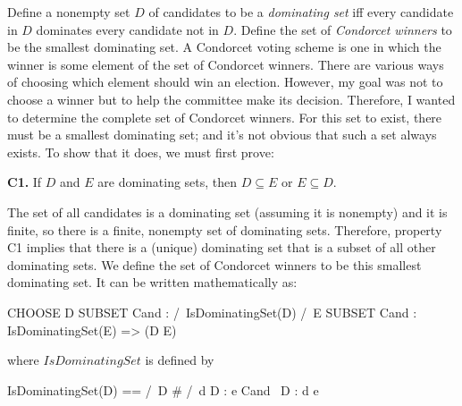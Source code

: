 \documentclass[fleqn,leqno]{article}
\begin{document}
Define a nonempty set $D$ of candidates to be a 
\emph{dominating set}
iff every candidate in $D$ dominates every candidate not in $D$.
Define the set of \emph{Condorcet winners} to be the smallest
dominating set.  A Condorcet voting scheme is one in
which the winner is some element of the set of Condorcet winners.
There are various ways of choosing which element should win an
election.  However, my goal was not to choose a winner but to help the
committee make its decision.  Therefore, I wanted to determine the
complete set of Condorcet winners.  For this set to exist, there must
be a smallest dominating set; and it's not obvious that such a set
always exists.  To show that it does, we must first prove:
\begin{display}
\textbf{C1.} If $D$ and $E$ are dominating sets, then $D\subseteq E$
or $E \subseteq D$.
%
\end{display}
The set of all candidates is a dominating set (assuming it is
nonempty) and it is finite, so there is a finite, nonempty set of
dominating sets.  Therefore, property C1 implies that there is
a (unique) dominating set that is a subset of all other dominating
sets.  We define the set of Condorcet winners to be this smallest
dominating set.  It can be written mathematically as:
\begin{display}
\begin{notla}
CHOOSE D \in SUBSET Cand : 
  /\ IsDominatingSet(D)
  /\ \A E \in SUBSET Cand : IsDominatingSet(E) => (D \subseteq E)
\end{notla}
\begin{tlatex}
%
%
\end{tlatex}
\end{display}
where $IsDominatingSet$ is defined by
\begin{display}
\begin{notla}
IsDominatingSet(D) == /\ D # {}
                      /\ \A d \in D : \A e \in Cand \ D : d \succ e
\end{notla}
\begin{tlatex}
%
\end{tlatex}
\end{display}
\end{document}
